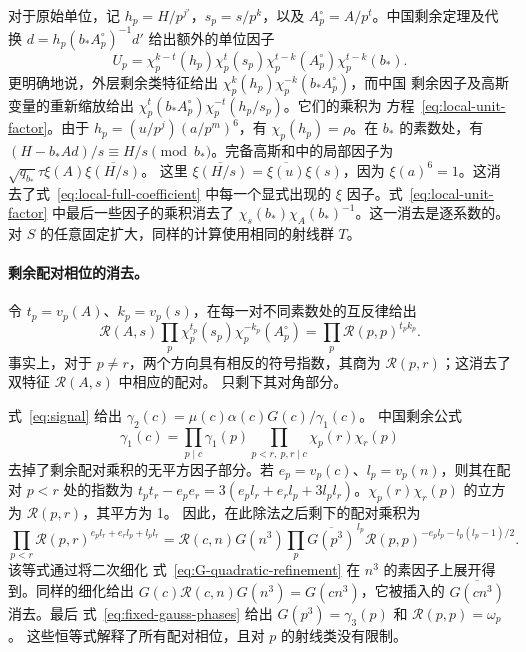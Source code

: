 \documentclass[11pt,a4paper]{article}
\numberwithin{equation}{section}
\numberwithin{figure}{section}
\theoremstyle{definition}
\theoremstyle{remark}
\begin{document}
对于原始单位，记 $h_p=H/p^{j'}$，$s_p=s/p^k$，以及
$A_p^\circ=A/p^t$。中国剩余定理及代换
$d=h_p(b_*A_p^\circ)^{-1}d'$ 给出额外的单位因子
\begin{equation}\label{eq:local-unit-factor}
 U_p=\chi_p^{k-t}(h_p)\chi_p^t(s_p)
       \chi_p^{t-k}(A_p^\circ)\chi_p^{t-k}(b_*).
\end{equation}
更明确地说，外层剩余类特征给出
$\chi_p^k(h_p)\chi_p^{-k}(b_*A_p^\circ)$，而中国
剩余因子及高斯变量的重新缩放给出
$\chi_p^t(b_*A_p^\circ)\chi_p^{-t}(h_p/s_p)$。它们的乘积为
方程~\eqref{eq:local-unit-factor}。由于
$h_p=(u/p^j)(a/p^m)^6$，有 $\chi_p(h_p)=\rho$。在 $b_*$ 的素数处，有
$(H-b_*Ad)/s\equiv H/s\pmod {b_*}$。完备高斯和中的局部因子为
$\sqrt{q_{b_*}}\tau\xi(A)\overline{\xi(H/s)}$。
这里 $\overline{\xi(H/s)}=\overline{\xi(u)}\xi(s)$，因为
$\xi(a)^6=1$。这消去了式~\eqref{eq:local-full-coefficient} 中每一个显式出现的 $\xi$ 因子。式~\eqref{eq:local-unit-factor} 中最后一些因子的乘积消去了
$\chi_s(b_*)\chi_A(b_*)^{-1}$。这一消去是逐系数的。
对 $S$ 的任意固定扩大，同样的计算使用相同的射线群 $T$。

\paragraph{剩余配对相位的消去。}
令 $t_p=v_p(A)$、$k_p=v_p(s)$，在每一对不同素数处的互反律给出
\[
 \mathcal R(A,s)\prod_p
       \chi_p^{t_p}(s_p)\chi_p^{-k_p}(A_p^\circ)
       =\prod_p\mathcal R(p,p)^{t_pk_p}.
\]
事实上，对于 $p\ne r$，两个方向具有相反的符号指数，其商为 $\mathcal R(p,r)$；这消去了双特征 $\mathcal R(A,s)$ 中相应的配对。
只剩下其对角部分。

式~\eqref{eq:signal} 给出
$\gamma_2(c)=\mu(c)\alpha(c)G(c)/\gamma_1(c)$。
中国剩余公式
\[
 \gamma_1(c)=\prod_{p\mid c}\gamma_1(p)
             \prod_{p<r,\ p,r\mid c}\chi_p(r)\chi_r(p)
\]
去掉了剩余配对乘积的无平方因子部分。若
$e_p=v_p(c)$、$l_p=v_p(n)$，则其在配对 $p<r$ 处的指数为
$t_pt_r-e_pe_r=3(e_pl_r+e_rl_p+3l_pl_r)$。$\chi_p(r)\chi_r(p)$ 的立方为 $\mathcal R(p,r)$，其平方为 1。
因此，在此除法之后剩下的配对乘积为
\[
 \prod_{p<r}\mathcal R(p,r)^{e_pl_r+e_rl_p+l_pl_r}
 =\mathcal R(c,n)G(n^3)
   \prod_p\overline{G(p^3)}^{\,l_p}
            \mathcal R(p,p)^{-e_pl_p-l_p(l_p-1)/2}.
\]
该等式通过将二次细化
式~\eqref{eq:G-quadratic-refinement} 在 $n^3$ 的素因子上展开得到。同样的细化给出
$G(c)\mathcal R(c,n)G(n^3)=G(cn^3)$，它被插入的 $\overline{G(cn^3)}$ 消去。最后
式~\eqref{eq:fixed-gauss-phases} 给出
$G(p^3)=\gamma_3(p)$ 和 $\mathcal R(p,p)=\omega_p$。
这些恒等式解释了所有配对相位，且对 $p$ 的射线类没有限制。
\end{document}
